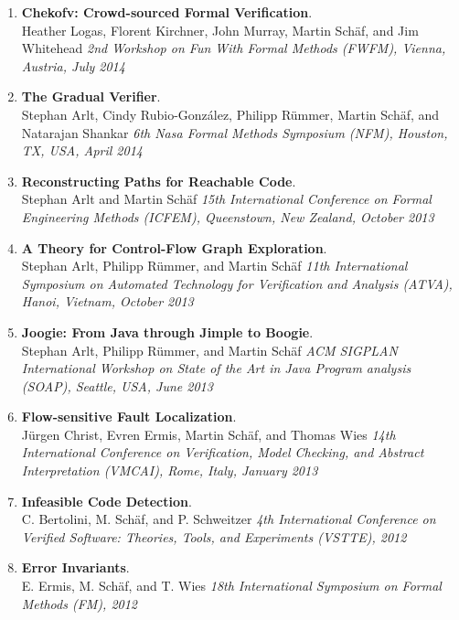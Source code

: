 \begin{enumerate}
  \item \textbf{Chekofv: Crowd-sourced Formal Verification}.
  \\  Heather Logas, Florent Kirchner, John Murray, Martin Schäf, and Jim Whitehead
  \emph{2nd Workshop on Fun With Formal Methods (FWFM), Vienna, Austria, July 2014}

  \item \textbf{The Gradual Verifier}.
  \\  Stephan Arlt, Cindy Rubio-González, Philipp Rümmer, Martin Schäf, and Natarajan Shankar
  \emph{6th Nasa Formal Methods Symposium (NFM), Houston, TX, USA, April 2014}

  \item \textbf{Reconstructing Paths for Reachable Code}.
  \\  Stephan Arlt and Martin Schäf
  \emph{15th International Conference on Formal Engineering Methods (ICFEM), Queenstown, New Zealand, October 2013}

  \item \textbf{A Theory for Control-Flow Graph Exploration}.
  \\  Stephan Arlt, Philipp Rümmer, and Martin Schäf
  \emph{11th International Symposium on Automated Technology for Verification and Analysis (ATVA), Hanoi, Vietnam, October 2013}

  \item \textbf{Joogie: From Java through Jimple to Boogie}.
  \\  Stephan Arlt, Philipp Rümmer, and Martin Schäf
  \emph{ACM SIGPLAN International Workshop on State of the Art in Java Program analysis (SOAP), Seattle, USA, June 2013}

  \item \textbf{Flow-sensitive Fault Localization}.
  \\  Jürgen Christ, Evren Ermis, Martin Schäf, and Thomas Wies
  \emph{14th International Conference on Verification, Model Checking, and Abstract Interpretation (VMCAI), Rome, Italy, January 2013}

  \item \textbf{Infeasible Code Detection}.
  \\  C. Bertolini, M. Schäf, and P. Schweitzer
  \emph{4th International Conference on Verified Software: Theories, Tools, and Experiments (VSTTE), 2012}

  \item \textbf{Error Invariants}.
  \\  E. Ermis, M. Schäf, and T. Wies
  \emph{18th International Symposium on Formal Methods (FM), 2012}


\end{enumerate}
